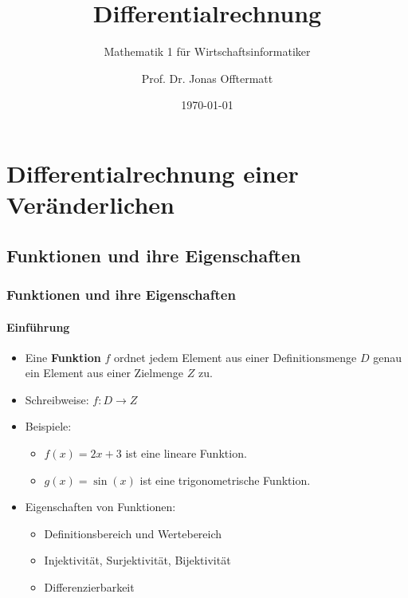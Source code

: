 \documentclass{beamer}
\title{Differentialrechnung}
\subtitle{Mathematik 1 für Wirtschaftsinformatiker}
\author{Prof. Dr. Jonas Offtermatt}
\date{\today}
\begin{document}
\section{Differentialrechnung einer Veränderlichen}
\subsection{Funktionen und ihre Eigenschaften}

\begin{frame}
  \frametitle{Funktionen und ihre Eigenschaften}
  \framesubtitle{Einführung}

  \begin{itemize}
    \item Eine \textbf{Funktion} $f$ ordnet jedem Element aus einer Definitionsmenge $D$ genau ein Element aus einer Zielmenge $Z$ zu.
    \item Schreibweise: $f: D \to Z$
    \item Beispiele:
      \begin{itemize}
        \item $f(x) = 2x + 3$ ist eine lineare Funktion.
        \item $g(x) = \sin(x)$ ist eine trigonometrische Funktion.
      \end{itemize}
    \item Eigenschaften von Funktionen:
      \begin{itemize}
        \item Definitionsbereich und Wertebereich
        \item Injektivität, Surjektivität, Bijektivität
        \item Differenzierbarkeit
      \end{itemize}
  \end{itemize}
\end{frame}
\end{document}
